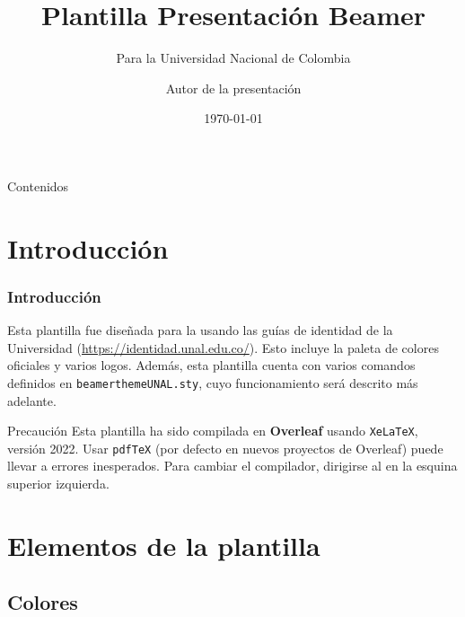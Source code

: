 \documentclass[aspectratio=169,usenames,dvipsnames,spanish]{beamer}
\title[Plantilla Beamer]{Plantilla Presentación Beamer}
\subtitle{Para la Universidad Nacional de Colombia}
\author[Autor]{Autor de la presentación}
\institute{Universidad Nacional de Colombia - Sede Bogotá}
\date{\today}
\begin{document}
\justifying %
\begin{frame}
    \titlepage 
\end{frame}
\begin{frame}{Contenidos}
    \tableofcontents
\end{frame}

\section{Introducción}

\begin{frame}
\frametitle{Introducción}
   Esta plantilla  fue diseñada para la  usando las guías de identidad de la Universidad (\url{https://identidad.unal.edu.co/}). Esto incluye la paleta de colores oficiales y varios logos. Además, esta plantilla cuenta con varios comandos definidos en \texttt{beamerthemeUNAL.sty}, cuyo funcionamiento será descrito más adelante.

   \begin{alertblock}{Precaución}
   \justifying
       Esta plantilla ha sido compilada en \textbf{Overleaf} usando \texttt{XeLaTeX}, versión 2022. Usar \texttt{pdfTeX} (por defecto en nuevos proyectos de Overleaf) puede llevar a errores inesperados. Para cambiar el compilador, dirigirse al  en la esquina superior izquierda.
   \end{alertblock}
\end{frame}

\section{Elementos de la plantilla}

\subsection{Colores}
\end{document}
